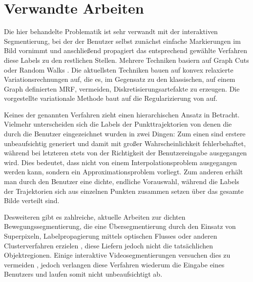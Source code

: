 \section{Verwandte Arbeiten}

Die hier behandelte Problematik ist sehr verwandt mit der interaktiven Segmentierung,
bei der der Benutzer selbst zunächst einfache Markierungen im Bild vornimmt
und anschließend propagiert das entsprechend gewählte Verfahren diese Labels zu den restlichen Stellen.
Mehrere Techniken basiern auf Graph Cuts \cite{} oder Random Walks \cite{}.
Die aktuellsten Techniken bauen auf konvex relaxierte Variationsrechnungen \cite{} auf, die es, im Gegensatz zu den klassischen,
auf einem Graph definierten MRF, vermeiden, Diskretisierungsartefakte zu erzeugen.
Die vorgestellte variationale Methode baut auf die Regularizierung von \cite{} auf.

Keines der genannten Verfahren zieht einen hierarchischen Ansatz in Betracht. Vielmehr unterscheiden sich die Labels
der Punkttrajektorien von denen die durch die Benutzer eingezeichnet wurden in zwei Dingen:
Zum einen sind erstere unbeaufsichtig generiert und damit mit großer Wahrscheinlichkeit fehlerbehaftet, während bei letzteren stets
von der Richtigkeit der Benutzereingabe ausgegangen wird. Dies bedeutet, dass nicht von einem Interpolationsproblem ausgegangen werden kann,
sondern ein Approximationsproblem vorliegt.
Zum anderen erhält man durch den Benutzer eine dichte, endliche Vorauswahl, während die Labels der Trajektorien sich aus einzelnen Punkten zusammen
setzen über das gesamte Bilde verteilt sind.

Desweiteren gibt es zahlreiche, aktuelle Arbeiten zur dichten Bewegungssegmentierung, die eine Übersegmentierung durch den Einsatz von
Superpixeln, Labelpropagierung mittels optischen Flusses oder anderen Clusterverfahren erzielen \cite{}, diese Liefern jedoch nicht die tatsächlichen
Objektregionen. Einige interaktive Videosegmentierungen versuchen dies zu vermeiden \cite{}, jedoch verlangen diese Verfahren wiederum die Eingabe eines
Benutzers und laufen somit nicht unbeaufsichtigt ab.